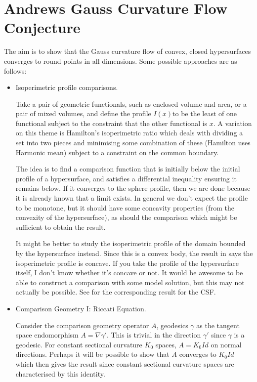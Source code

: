 \documentclass{amsart}
\begin{document}
\section{Andrews Gauss Curvature Flow Conjecture}

The aim is to show that the Gauss curvature flow of convex, closed hypersurfaces converges to round points in all dimensions. Some possible approaches are as follows:

\begin{itemize}
\item Isoperimetric profile comparisons. 

Take a pair of geometric functionals, such as enclosed volume and area, or a pair of mixed volumes, and define the profile $I(x)$to be the least of one functional subject to the constraint that the other functional is $x$. A variation on this theme is Hamilton's isoperimetric ratio which deals with dividing a set into two pieces and minimising some combination of these (Hamilton uses Harmonic mean) subject to a constraint on the common boundary. 

The idea is to find a comparison function that is initially below the initial profile of a hypersurface, and satisfies a differential inequality ensuring it remains below. If it converges to the sphere profile, then we are done because it is already known that a limit exists. In general we don't expect the profile to be monotone, but it should have some concavity properties (from the convexity of the hypersurface), as should the comparison which might be sufficient to obtain the result. 

It might be better to study the isoperimetric profile of the domain bounded by the hypersurface instead. Since this is a convex body, the result in \cite{MR1674097} says the isoperimetric profile is concave. If you take the profile of the hypersurface itself, I don't know whether it's concave or not. It would be awesome to be able to construct a comparison with some model solution, but this may not actually be possible. See \cite{MR2843240} for the corresponding result for the CSF.

\item Comparison Geometry I: Riccati Equation.

Consider the comparison geometry operator $A$, geodesics $\gamma$ as the tangent space endomorphism $A = \nabla \gamma'$. This is trivial in the direction $\gamma'$ since $\gamma$ is a geodesic. For constant sectional curvature $K_0$ spaces, $A = K_0 Id$ on normal directions. Perhaps it will be possible to show that $A$ converges to $K_0 Id$ which then gives the result since constant sectional curvature spaces are characterised by this identity. 


\end{itemize}
\end{document}
